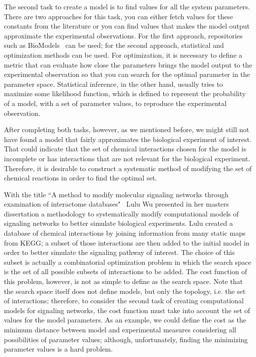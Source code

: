 The second task to create a model is to find values for all the system
parameters. There are two approaches for this task, you can either 
fetch values for these constants from the literature or you can find 
values that makes the model output approximate the experimental 
observations. For the first approach, repositories such as 
BioModels~\cite{le2006biomodels} can be used; for the second approach, 
statistical and optimization methods can be used. For optimization, it 
is necessary to define a metric that can evaluate how close the 
parameters brings the model output to the experimental observation so
that you can search for the optimal parameter in the parameter space. 
Statistical inference, in the other hand, usually tries to maximize some 
likelihood function, which is defined to represent the probability of a 
model, with a set of parameter values, to reproduce the experimental 
observation.

After completing both tasks, however, as we mentioned before, we might 
still not have found a model that fairly approximates the biological 
experiment of interest. That could indicate that the set of chemical 
interactions chosen for the model is incomplete or has interactions that
are not relevant for the biological experiment. Therefore, it is 
desirable to construct a systematic method of modifying the set of 
chemical reactions in order to find the optimal set.

With the title ``A method to modify molecular signaling networks through
examination of interactome databases"~\cite{Wu15} Lulu Wu presented in 
her masters dissertation a methodology to systematically modify 
computational models of signaling networks to better simulate biological 
experiments. Lulu created a database of chemical interactions by joining 
information from many static maps from KEGG; a subset of those interactions are 
then added to the initial model in order to better simulate the 
signaling pathway of interest. The choice of this subset is actually a 
combinatorial optimization problem in which the search space is the 
set of all possible subsets of interactions to be added. The cost 
function of this problem, however, is not as simple to define as the 
search space. Note that the search space itself does not define models, 
but only the topology, i.e. the set of interactions; therefore, to 
consider the second task of creating computational models for signaling
networks, the cost function must take into account the set of values for 
the model parameters. As an example, we could define the cost as the 
minimum distance between model and experimental measures considering all
possibilities of parameter values; although, unfortunately, finding the
minimizing parameter values is a hard problem.

